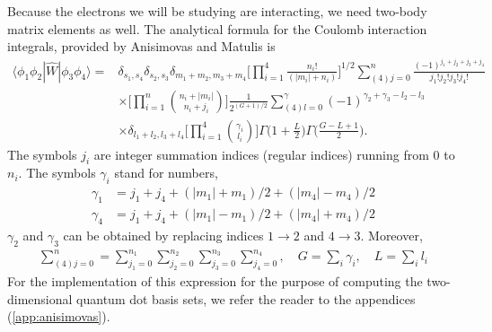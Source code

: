 Because the electrons we will be studying are interacting, we need two-body matrix elements 
as well. The analytical formula for the Coulomb interaction integrals, provided by Anisimovas and 
Matulis\cite{anisimovas1998energy} is
\begin{equation}
    \begin{aligned}
        \langle \phi_1\phi_2| \hat{W} | \phi_3\phi_4 \rangle =& 
        \delta_{s_1, s_4} \delta_{s_2, s_3} \delta_{m_1 + m_2, m_3 + m_4}
        \Big[\prod_{i=1}^4 \frac{n_i!}{(|m_i| + n_i)} \Big]^{1/2}
        \sum_{(4)j=0}^n \frac{(-1)^{j_1+j_2+j_3+j_4}}{j_1!j_2!j_3!j_4!} \\
        &\times \Big[\prod_{i=1}^n {n_i + |m_i| \choose n_i + j_i} \Big]
        \frac{1}{2^{(G+1)/2}} \sum_{(4)l=0}^\gamma (-1)^{\gamma_2 + \gamma_3 - l_2 - l_3} \\
        &\times \delta_{l_1 + l_2, l_3 + l_4} \Big[\prod_{i=1}^4 {\gamma_i \choose l_i} \Big] 
        \Gamma\Big(1 + \frac{L}{2} \Big)\Gamma\Big(\frac{G - L + 1}{2}\Big).
    \end{aligned}
\end{equation}
The symbols $j_i$ are integer summation indices (regular indices) running from $0$ to $n_i$.
The symbols $\gamma_i$ stand for numbers,
\begin{align*}
\gamma_1 &= j_1 + j_4 + (|m_1| + m_1)/2 + (|m_4| - m_4)/2 \\
\gamma_4 &= j_1 + j_4 + (|m_1| - m_1)/2 + (|m_4| + m_4)/2
\end{align*}
$\gamma_2$ and $\gamma_3$ can be obtained by replacing indices $1 \to 2$ and $4 \to 3$.
Moreover,
\begin{align*}
\sum_{(4)j=0}^n =
\sum_{j_1=0}^{n_1}\sum_{j_2=0}^{n_2}\sum_{j_3=0}^{n_3}\sum_{j_4=0}^{n_4},
\quad 
G = \sum_i \gamma_i, 
\quad
L = \sum_i l_i
\end{align*}
For the implementation of this expression for the purpose of computing the two-dimensional 
quantum dot basis sets, we refer the reader to the appendices (\autoref{app:anisimovas}).

